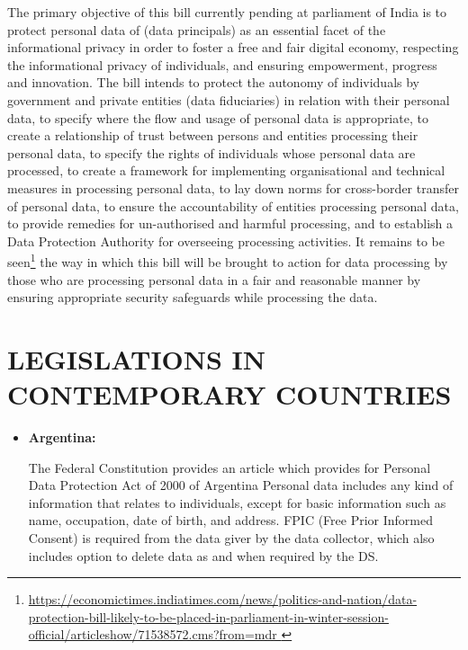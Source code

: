 \begin{multicols}{2}
\begin{itemize}
The primary objective of this bill currently pending at parliament of India is to protect personal data of (data principals) as an essential facet of the informational privacy in order to foster a free and fair digital economy, respecting the informational privacy of individuals, and ensuring empowerment, progress and innovation. The bill intends to protect the autonomy of individuals by government and private entities (data fiduciaries) in relation with their personal data, to specify where the flow and usage of personal data is appropriate, to create a relationship of trust between persons and entities processing their personal data, to specify the rights of individuals whose personal data are processed, to create a framework for implementing organisational and technical measures in processing personal data, to lay down norms for cross-border transfer of personal data, to ensure the accountability of entities processing personal data, to provide remedies for un-authorised and harmful processing, and to establish a Data Protection Authority for overseeing processing activities. It remains to be seen\footnote{\url{https://economictimes.indiatimes.com/news/politics-and-nation/data-protection-bill-likely-to-be-placed-in-parliament-in-winter-session-official/articleshow/71538572.cms?from=mdr }} the way in which this bill will be brought to action for data processing by those who are processing personal data in a fair and reasonable manner by ensuring appropriate security safeguards while processing the data.
\end{itemize}

\section{LEGISLATIONS IN\\ CONTEMPORARY COUNTRIES}

\begin{itemize}

\item[{\bf 1)}] \textbf{Argentina:}

The Federal Constitution provides an article which provides for Personal Data Protection Act of 2000 of Argentina Personal data includes any kind of information that relates to individuals, except for basic information such as name, occupation, date of birth, and address. FPIC (Free Prior Informed Consent) is required from the data giver by the data collector, which also includes option to delete data as and when required by the DS.


\end{itemize}
\end{multicols}
